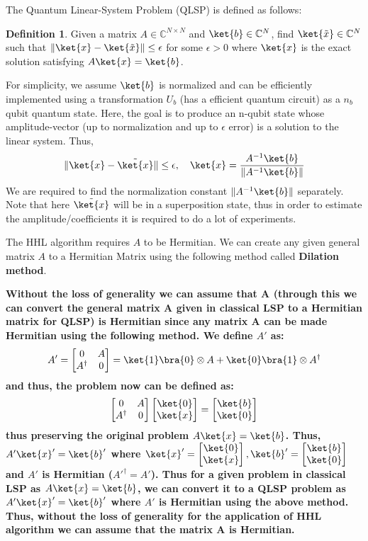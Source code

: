 \documentclass[12pt, oneside]{book}
\theoremstyle{definition}
\newtheorem{definition}{Definition}[section]
\theoremstyle{definition}
\theoremstyle{remark}
\begin{document}
The Quantum Linear-System Problem (QLSP) is defined as follows:
\begin{definition}
Given a matrix $A\in \mathbb{C}^{N \times N}$ and $\ket{b} \in \mathbb{C}^N$, find $\ket{\tilde{x}} \in \mathbb{C}^N$
such that $\|\ket{x}-\ket{\tilde{x}}\|\leq \epsilon$ for some $\epsilon>0$ where $\ket{x}$ is the exact solution
satisfying $A\ket{x}=\ket{b}$.
\end{definition}

For simplicity, we assume $\ket{b}$ is normalized and can be efficiently implemented using a transformation $U_b$ (has a efficient quantum circuit) as a $n_b$ qubit quantum state. Here, the goal is to produce an n-qubit state whose amplitude-vector (up to normalization and up to $\epsilon$ error) 
is a solution to the linear system. Thus,
\[
\|\ket{x}-\tilde{\ket{x}}\|\leq \epsilon,\quad \ket{x}=\frac{A^{-1}\ket{b}}{\|A^{-1}\ket{b}\|}
\]
We are required to find the normalization constant $\|A^{-1}\ket{b}\|$ separately. Note that here $\tilde{\ket{x}}$ will be in a superposition state, thus in order to estimate the amplitude/coefficients it is required to do a lot of experiments. 

The HHL algorithm requires $A$ to be Hermitian. We can create any given general matrix $A$ to a Hermitian Matrix using the following method called \textbf{Dilation method}.

\textbf{Without the loss of generality we can assume that A (through this we can convert the general matrix A given in classical LSP to a Hermitian matrix for QLSP) is Hermitian since any matrix A can be made Hermitian using the following method.
We define $A'$ as:}
\[
A'=\begin{bmatrix} 0 & A \\ A^{\dagger} & 0 \end{bmatrix}=\ket{1}\bra{0}\otimes A+ \ket{0}\bra{1}\otimes A^{\dagger}
\]
\textbf{and thus, the problem now can be defined as:}
\[
\begin{bmatrix} 0 & A \\ A^{\dagger} & 0 \end{bmatrix} \begin{bmatrix} \ket{0} \\ \ket{x} \end{bmatrix} = \begin{bmatrix} \ket{b} \\ \ket{0} \end{bmatrix}
\]
\textbf{thus preserving the original problem $A\ket{x}=\ket{b}$. Thus, $A'\ket{x}'=\ket{b}'$ where 
$\ket{x}'=\begin{bmatrix} \ket{0}\\ \ket{x} \end{bmatrix}, \ket{b}'=\begin{bmatrix}\ket{b}\\ \ket{0} \end{bmatrix}$
and $A'$ is Hermitian ($A'^{\dagger}=A'$). Thus for a given problem in classical LSP as $A\ket{x}=\ket{b}$, we can convert
it to a QLSP problem as $A'\ket{x}'=\ket{b}'$ where $A'$ is Hermitian using the above method. Thus, without the loss of generality for the application of 
HHL algorithm we can assume that the matrix A is Hermitian.}
\end{document}
